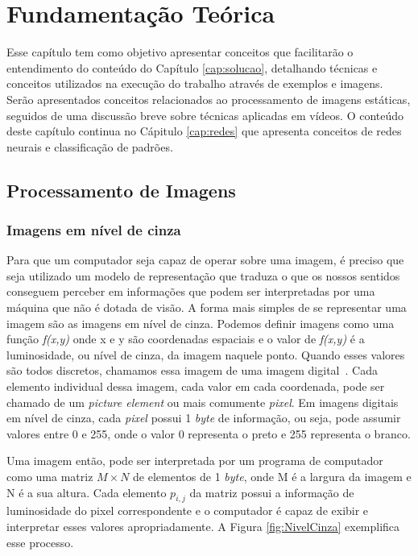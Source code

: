 \chapter{Fundamentação Teórica}\label{cap:fundament}



Esse capítulo tem como objetivo apresentar conceitos que facilitarão o entendimento do conteúdo do Capítulo \ref{cap:solucao}, detalhando técnicas e conceitos utilizados na execução do trabalho através de exemplos e imagens. Serão apresentados conceitos relacionados ao processamento de imagens estáticas, seguidos de uma discussão breve sobre técnicas aplicadas em vídeos. O conteúdo deste capítulo continua no Cápitulo \ref{cap:redes} que apresenta conceitos de redes neurais e classificação de padrões. 

\section{Processamento de Imagens}\label{sec:processamento}

\subsection{Imagens em nível de cinza}

Para que um computador seja capaz de operar sobre uma imagem, é preciso que seja utilizado um modelo de representação que traduza o que os nossos sentidos conseguem perceber em informações que podem ser interpretadas por uma máquina que não é dotada de visão. A forma mais simples de se representar uma imagem são as imagens em nível de cinza. Podemos definir imagens como uma função \textit{f{(x,y)}} onde x e y são coordenadas espaciais e o valor de  \textit{f{(x,y)}} é a luminosidade, ou nível de cinza, da imagem naquele ponto. Quando esses valores são todos discretos, chamamos essa imagem de uma imagem digital~\cite{gonzalez2009digital}. Cada elemento individual dessa imagem, cada valor em cada coordenada, pode ser chamado de um \textit{picture element} ou mais comumente \textit{pixel}. Em imagens digitais em nível de cinza, cada \textit{pixel} possui 1 \textit{byte} de informação, ou seja, pode assumir valores entre 0 e 255, onde o valor 0 representa o preto e 255 representa o branco. 

Uma imagem então, pode ser interpretada por um programa de computador como uma matriz $M\times N$ de elementos de 1 \textit{byte}, onde M é a largura da imagem e N é a sua altura. Cada elemento $p_{i,j}$ da matriz possui a informação de luminosidade do pixel correspondente e o computador é capaz de exibir e interpretar esses valores apropriadamente. A Figura \ref{fig:NivelCinza} exemplifica esse processo.

